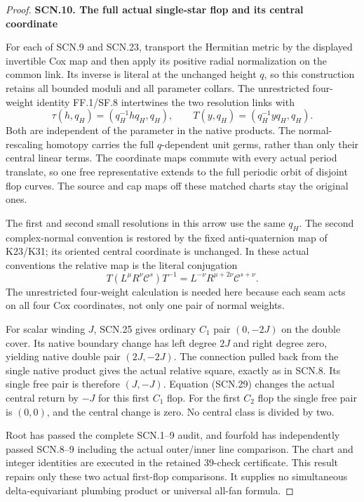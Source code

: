 \begin{proof}
\par

\medskip\noindent\textbf{SCN.10. The full actual single-star flop and its central coordinate}

\par\nobreak

For each of SCN.9 and SCN.23, transport the Hermitian
metric by the displayed invertible Cox map and then
apply its positive radial normalization on the common
link. Its inverse is literal at the unchanged height
\(q\), so this construction retains all bounded
moduli and all parameter collars. The unrestricted
four-weight identity FF.1/SF.8 intertwines the two
resolution links with
\[
  \tau(h,q_H)=(q_H^{-1}h q_H,q_H),\qquad
  T(y,q_H)=(q_H^{-1}yq_H,q_H).                         \tag{SCN.28}
\]
Both are independent of the parameter in the native
products. The normal-rescaling homotopy carries the
full \(q\)-dependent unit germs, rather than only
their central linear terms. The coordinate maps
commute with every actual period translate, so one
free representative extends to the full periodic
orbit of disjoint flop curves. The source and cap
maps off these matched charts stay the original ones.

The first and second small resolutions in this arrow
use the same \(q_H\). The second complex-normal
convention is restored by the fixed anti-quaternion
map of K23/K31; its oriented central coordinate is
unchanged. In these actual conventions the relative
map is the literal conjugation
\[
 T(L^\mu R^\nu\mathcal C^s)T^{-1}
          =L^{-\nu}R^{\mu+2\nu}\mathcal C^{s+\nu}.
                                                        \tag{SCN.29}
\]
The unrestricted four-weight calculation is needed
here because each seam acts on all four Cox
coordinates, not only one pair of normal weights.

For scalar winding \(J\), SCN.25 gives ordinary
\(C_1\) pair \((0,-2J)\) on the double cover. Its
native boundary change has left degree \(2J\) and
right degree zero, yielding native double pair
\((2J,-2J)\). The connection pulled back from the
single native product gives the actual relative
square, exactly as in SCN.8. Its single free pair
is therefore \((J,-J)\). Equation (SCN.29) changes
the actual central return by \(-J\) for this first
\(C_1\) flop. For the first \(C_2\) flop the single
free pair is \((0,0)\), and the central change is
zero. No central class is divided by two.

Root has passed the complete SCN.1--9 audit, and
fourfold has independently passed SCN.8--9 including
the actual outer/inner line comparison. The chart
and integer identities are executed in the retained
39-check certificate. This result repairs only
these two actual first-flop comparisons. It supplies
no simultaneous delta-equivariant plumbing product
or universal all-fan formula.
\end{proof}
